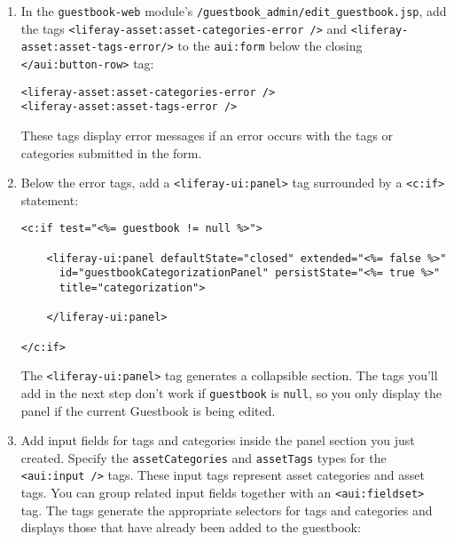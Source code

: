 \begin{enumerate}
\def\labelenumi{\arabic{enumi}.}
\item
  In the \texttt{guestbook-web} module's
  \texttt{/guestbook\_admin/edit\_guestbook.jsp}, add the tags
  \texttt{\textless{}liferay-asset:asset-categories-error\ /\textgreater{}}
  and \texttt{\textless{}liferay-asset:asset-tags-error/\textgreater{}}
  to the \texttt{aui:form} below the closing
  \texttt{\textless{}/aui:button-row\textgreater{}} tag:

\begin{verbatim}
<liferay-asset:asset-categories-error />
<liferay-asset:asset-tags-error />
\end{verbatim}

  These tags display error messages if an error occurs with the tags or
  categories submitted in the form.
\item
  Below the error tags, add a
  \texttt{\textless{}liferay-ui:panel\textgreater{}} tag surrounded by a
  \texttt{\textless{}c:if\textgreater{}} statement:

\begin{verbatim}
<c:if test="<%= guestbook != null %>">

    <liferay-ui:panel defaultState="closed" extended="<%= false %>"
      id="guestbookCategorizationPanel" persistState="<%= true %>"
      title="categorization">

    </liferay-ui:panel>

</c:if>
\end{verbatim}

  The \texttt{\textless{}liferay-ui:panel\textgreater{}} tag generates a
  collapsible section. The tags you'll add in the next step don't work
  if \texttt{guestbook} is \texttt{null}, so you only display the panel
  if the current Guestbook is being edited.
\item
  Add input fields for tags and categories inside the panel section you
  just created. Specify the \texttt{assetCategories} and
  \texttt{assetTags} types for the
  \texttt{\textless{}aui:input\ /\textgreater{}} tags. These input tags
  represent asset categories and asset tags. You can group related input
  fields together with an \texttt{\textless{}aui:fieldset\textgreater{}}
  tag. The tags generate the appropriate selectors for tags and
  categories and displays those that have already been added to the
  guestbook:


\end{enumerate}
